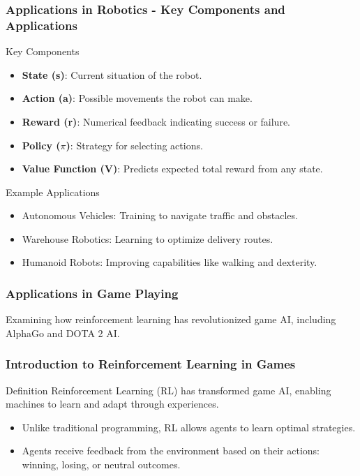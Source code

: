 \documentclass[aspectratio=169]{beamer}
\begin{document}
\begin{frame}[fragile]
    \frametitle{Applications in Robotics - Key Components and Applications}
    \begin{block}{Key Components}
        \begin{itemize}
            \item \textbf{State (s)}: Current situation of the robot.
            \item \textbf{Action (a)}: Possible movements the robot can make.
            \item \textbf{Reward (r)}: Numerical feedback indicating success or failure.
            \item \textbf{Policy (\(\pi\))}: Strategy for selecting actions.
            \item \textbf{Value Function (V)}: Predicts expected total reward from any state.
        \end{itemize}
    \end{block}

    \begin{block}{Example Applications}
        \begin{itemize}
            \item Autonomous Vehicles: Training to navigate traffic and obstacles.
            \item Warehouse Robotics: Learning to optimize delivery routes.
            \item Humanoid Robots: Improving capabilities like walking and dexterity.
        \end{itemize}
    \end{block}
\end{frame}

\begin{frame}[fragile]
    \frametitle{Applications in Game Playing}
    Examining how reinforcement learning has revolutionized game AI, including AlphaGo and DOTA 2 AI.
\end{frame}

\begin{frame}[fragile]
    \frametitle{Introduction to Reinforcement Learning in Games}
    \begin{block}{Definition}
        Reinforcement Learning (RL) has transformed game AI, enabling machines to learn and adapt through experiences.
    \end{block}
    \begin{itemize}
        \item Unlike traditional programming, RL allows agents to learn optimal strategies.
        \item Agents receive feedback from the environment based on their actions: winning, losing, or neutral outcomes.
    \end{itemize}
\end{frame}
\end{document}
